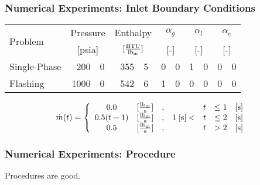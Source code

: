 \documentclass[compress,xcolor=table]{beamer}
\begin{document}
\begin{frame}
\frametitle{Numerical Experiments: Inlet Boundary Conditions}

\begin{table}[ht]
\centering
\begin{tabular}{@{}lr@{.}lr@{.}lr@{.}lr@{.}lr@{.}l@{}} \toprule
\multirow{2}{*}{Problem} & \multicolumn{2}{c}{Pressure} & \multicolumn{2}{c}{Enthalpy}             & \multicolumn{2}{c}{$\alpha_g$} & \multicolumn{2}{c}{$\alpha_l$} & \multicolumn{2}{c}{$\alpha_e$} \\ 
                         & \multicolumn{2}{c}{[psia]} & \multicolumn{2}{c}{$[\frac{\text{BTU}}{\lbm{}}]$} & \multicolumn{2}{c}{[-]}      & \multicolumn{2}{c}{[-]}      & \multicolumn{2}{c}{[-]}      \\ \midrule
Single-Phase             &  200&0                       &  355&5                                   & 0&0                            & 1&0                            & 0&0 \\
Flashing                 & 1000&0                       &  542&6                                   & 1&0                            & 0&0                            & 0&0 \\ \bottomrule  
\end{tabular}
\label{tab:bc_fe}
\end{table}

\begin{equation*}
\label{eqn:bc_time_func_single}
\dot{m}(t) = \left\{
\begin{array}{cclrcll}
 0.0           & [\frac{ \lbm{} }{\text{s}}] & , &                & t & \leq 1 & [\text{s}] \\
 0.5 ( t - 1)  & [\frac{ \lbm{} }{\text{s}}] & , & 1\; [\text{s}] < & t & \leq 2 & [\text{s}] \\
 0.5           & [\frac{ \lbm{} }{\text{s}}] & , &                & t & > 2    & [\text{s}]
\end{array}\right.
\end{equation*}

\end{frame}
\begin{frame}
\frametitle{Numerical Experiments: Procedure}

Procedures are good.

\end{frame}
\end{document}
